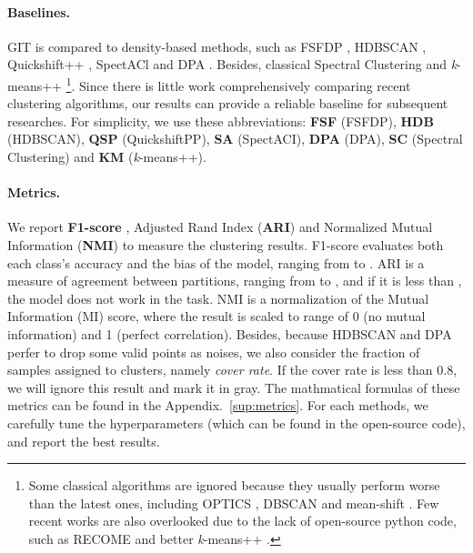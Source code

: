 \documentclass[letterpaper]{article} \usepackage{aaai22}  \usepackage{times}  \usepackage{helvet}  \usepackage{courier}  \usepackage[hyphens]{url}  \usepackage{graphicx} \urlstyle{rm} \def\UrlFont{\rm}  \usepackage{natbib}  \usepackage{caption} \DeclareCaptionStyle{ruled}{labelfont=normalfont,labelsep=colon,strut=off} \frenchspacing  \setlength{\pdfpagewidth}{8.5in}  \setlength{\pdfpageheight}{11in}  \usepackage{subfigure}
\begin{document}
\paragraph{Baselines.} GIT is compared to density-based methods, such as FSFDP \cite{rodriguez2014clustering}, HDBSCAN \cite{mcinnes2017accelerated}, Quickshift++ \cite{jiang2018quickshift++}, SpectACl \cite{hess2019spectacl} and DPA \cite{d2021automatic}. Besides, classical Spectral Clustering and \textit{k}-means++ \cite{scikit-learn}\footnote{Some classical algorithms are ignored because they usually perform worse than the latest ones, including  OPTICS \cite{ankerst1999optics}, DBSCAN \cite{ester1996density} and mean-shift \cite{comaniciu2002mean}. Few recent works are also overlooked due to the lack of open-source python code, such as RECOME \cite{geng2018recome} and better \textit{k}-means++ \cite{lattanzi2019better}. }. Since there is little work comprehensively comparing recent clustering algorithms, our results can provide a reliable baseline for subsequent researches. For simplicity, we use these abbreviations: \textbf{FSF} (FSFDP), \textbf{HDB} (HDBSCAN), \textbf{QSP} (QuickshiftPP), \textbf{SA} (SpectACI), \textbf{DPA} (DPA), \textbf{SC} (Spectral Clustering) and \textbf{KM} (\textit{k}-means++).

\paragraph{Metrics.} We report \textbf{F1-score} \cite{Larsen1999}, Adjusted Rand Index (\textbf{ARI}) \cite{Hubert1985} and Normalized Mutual Information (\textbf{NMI}) \cite{vinh2010information} to measure the clustering results. F1-score evaluates both each class's accuracy and the bias of the model, ranging from  to . ARI is a measure of agreement between partitions, ranging from  to , and if it is less than , the model does not work in the task. NMI is a normalization of the Mutual Information (MI) score, where the result is scaled to range of 0 (no mutual information) and 1 (perfect correlation). Besides, because HDBSCAN and DPA perfer to drop some valid points as noises, we also consider the fraction of samples assigned to clusters, namely \textit{cover rate}. If the cover rate is less than 0.8, we will ignore this result and mark it in gray. The mathmatical formulas of these metrics can be found in the Appendix.~\ref{sup:metrics}. For each methods, we carefully tune the hyperparameters (which can be found in the open-source code), and report the best results.
\end{document}
